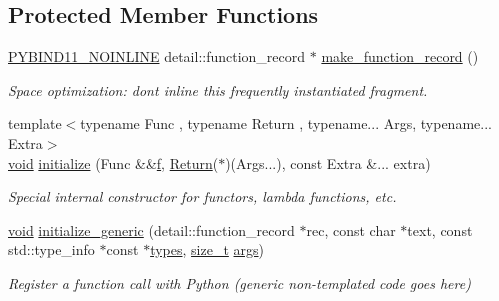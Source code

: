 \subsection*{Protected Member Functions}
\begin{DoxyCompactItemize}
\item 
\mbox{\hyperlink{detail_2common_8h_a1fb186b7494d5c576d902c0730ecbb71}{P\+Y\+B\+I\+N\+D11\+\_\+\+N\+O\+I\+N\+L\+I\+NE}} detail\+::function\+\_\+record $\ast$ \mbox{\hyperlink{classcpp__function_a7d2049a6916365d7d7de982d574e2f3c}{make\+\_\+function\+\_\+record}} ()
\begin{DoxyCompactList}\small\item\em Space optimization\+: don\textquotesingle{}t inline this frequently instantiated fragment. \end{DoxyCompactList}\item 
{\footnotesize template$<$typename Func , typename Return , typename... Args, typename... Extra$>$ }\\\mbox{\hyperlink{_s_d_l__opengles2__gl2ext_8h_ae5d8fa23ad07c48bb609509eae494c95}{void}} \mbox{\hyperlink{classcpp__function_a97487e306e9e0a8d0535fb5fe5c6d8ef}{initialize}} (Func \&\&\mbox{\hyperlink{_s_d_l__opengl__glext_8h_a691492ec0bd6383f91200e49f6ae40ed}{f}}, \mbox{\hyperlink{_python-ast_8h_abdae7f49d66ce8e500825bb53aa14901}{Return}}($\ast$)(Args...), const Extra \&... extra)
\begin{DoxyCompactList}\small\item\em Special internal constructor for functors, lambda functions, etc. \end{DoxyCompactList}\item 
\mbox{\hyperlink{_s_d_l__opengles2__gl2ext_8h_ae5d8fa23ad07c48bb609509eae494c95}{void}} \mbox{\hyperlink{classcpp__function_a4120dff5c867829edb5ad1df929ec522}{initialize\+\_\+generic}} (detail\+::function\+\_\+record $\ast$rec, const char $\ast$text, const std\+::type\+\_\+info $\ast$const $\ast$\mbox{\hyperlink{_s_d_l__opengl__glext_8h_a4acc56c8d89f835adc106648c5d9f491}{types}}, \mbox{\hyperlink{detail_2common_8h_a801d6a451a01953ef8cbae6feb6a3638}{size\+\_\+t}} \mbox{\hyperlink{classargs}{args}})
\begin{DoxyCompactList}\small\item\em Register a function call with Python (generic non-\/templated code goes here) \end{DoxyCompactList}\end{DoxyCompactItemize}
